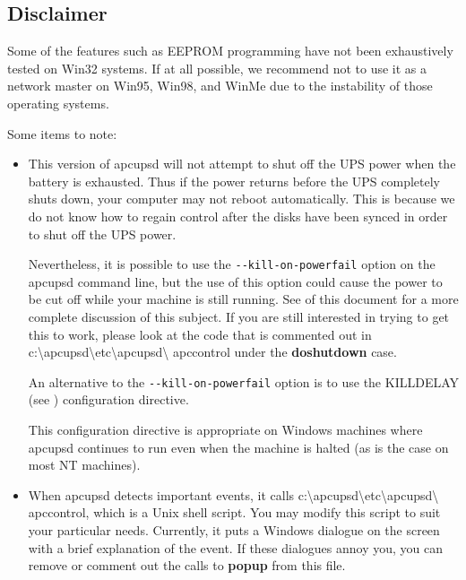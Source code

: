 {{{{{{{\label{Disclaimer}

\subsection*{Disclaimer}

\label{index-Disclaimer-180}
Some of the features such as EEPROM programming have not been exhaustively
tested on Win32 systems. If at all possible, we recommend not to use it as a
network master on Win95, Win98, and WinMe due to the instability of those
operating systems.  

Some items to note:  

\begin{itemize}
\item This version of apcupsd will not attempt to shut off the UPS power when
   the battery is exhausted. Thus if the power returns before the UPS completely
   shuts down, your computer may not reboot automatically. This is because we do
not know how to regain control after the disks have been synced in order to
shut off the UPS power.  

Nevertheless, it is possible to use the {\tt \verb{--{kill-on-powerfail} option on
the apcupsd command line, but the use of this option could cause the power to
be cut off while your machine is still running. See 
 of this
document for a more complete discussion of this subject. If you are still
interested in trying to get this to work, please look at the code that is
commented out in
c:\textbackslash{}apcupsd\textbackslash{}etc\textbackslash{}apcupsd\textbackslash
{}apccontrol under the {\bf doshutdown} case.  

An alternative to the {\tt \verb{--{kill-on-powerfail} option is to use the KILLDELAY
(see 
) configuration
directive.  

This configuration directive is appropriate on Windows machines where apcupsd
continues to run even when the machine is halted (as is the case on most NT
machines).  
\item When apcupsd detects important events, it calls
   c:\textbackslash{}apcupsd\textbackslash{}etc\textbackslash{}apcupsd\textbackslash
   {}apccontrol, which is a Unix shell script. You may modify this script to suit
your particular needs.  Currently, it puts a Windows dialogue on the screen
with a brief explanation of the event. If these dialogues annoy you, you can
remove or comment out the calls to {\bf popup} from this file. 
\end{itemize}

}}}}}}}
